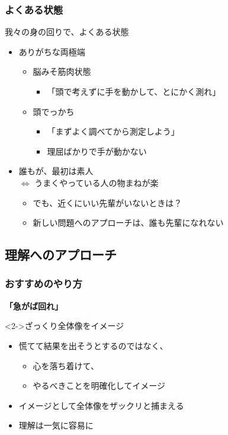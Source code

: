 \documentclass[12pt, dvipdfmx]{beamer}
\begin{document}
\begin{frame}
	\frametitle{よくある状態}
	\begin{exampleblock}{我々の身の回りで、よくある状態}
		\begin{itemize}
			\item ありがちな両極端
			\begin{itemize}
				\item 脳みそ筋肉状態
				\begin{itemize}
					\item 「頭で考えずに手を動かして、とにかく測れ」
				\end{itemize}
				\item 頭でっかち
				\begin{itemize}
					\item 「まずよく調べてから測定しよう」
					\item 理屈ばかりで手が動かない
				\end{itemize}
			\end{itemize}
			\item 誰もが、最初は素人 \\
			$\Leftrightarrow$ うまくやっている人の物まねが楽
			\begin{itemize}
				\item でも、近くにいい先輩がいないときは？
				\item 新しい問題へのアプローチは、誰も先輩になれない
			\end{itemize}
		\end{itemize}
	\end{exampleblock}
\end{frame}

\subsection{理解へのアプローチ}
\begin{frame}
	\frametitle{おすすめのやり方}
	{\fontsize{48pt}{10pt} \textbf{「急がば回れ」}}
	\vspace{5mm}
	\begin{alertblock}<2->{ざっくり全体像をイメージ}
		\begin{itemize}
			\item 慌てて結果を出そうとするのではなく、
			\begin{itemize}
				\item 心を落ち着けて、
				\item やるべきことを明確化してイメージ
			\end{itemize}
			\item イメージとして全体像をザックリと捕まえる
			\item 理解は一気に容易に
		\end{itemize}
	\end{alertblock}
\end{frame}
\end{document}

